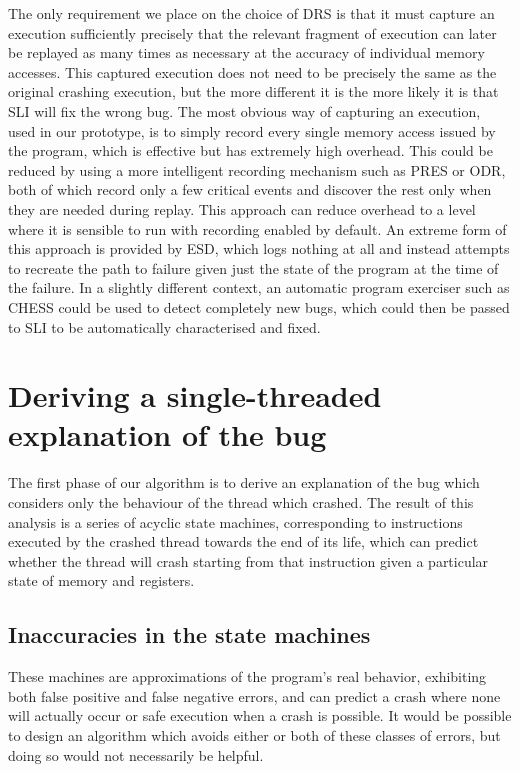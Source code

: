 \documentclass[10pt,twocolumn,preprint,natbib,authoryear]{sigplanconf}
\begin{document}
The only requirement we place on the choice of DRS is that it must
capture an execution sufficiently precisely that the relevant fragment
of execution can later be replayed as many times as necessary at the
accuracy of individual memory accesses.  This captured execution does
not need to be precisely the same as the original crashing execution,
but the more different it is the more likely it is that SLI will fix
the wrong bug.  The most obvious way of capturing an execution, used
in our prototype, is to simply record every single memory access
issued by the program, which is effective but has extremely high
overhead.  This could be reduced by using a more intelligent recording
mechanism such as PRES\cite{Park2009} or ODR\cite{Altekar2009}, both
of which record only a few critical events and discover the rest only
when they are needed during replay.  This approach can reduce overhead
to a level where it is sensible to run with recording enabled by
default.  An extreme form of this approach is provided by
ESD\cite{Zamfir2010}, which logs nothing at all and instead attempts
to recreate the path to failure given just the state of the program at
the time of the failure.  In a slightly different context, an
automatic program exerciser such as CHESS\cite{Musuvathi2008} could be
used to detect completely new bugs, which could then be passed to SLI
to be automatically characterised and fixed.

\section{Deriving a single-threaded explanation of the bug}
\label{sect:build_state_machines}

The first phase of our algorithm is to derive an explanation of the
bug which considers only the behaviour of the thread which crashed.
The result of this analysis is a series of acyclic state machines,
corresponding to instructions executed by the crashed thread towards
the end of its life, which can predict whether the thread will crash
starting from that instruction given a particular state of memory and
registers.

\subsection{Inaccuracies in the state machines}

These machines are approximations of the program's real behavior,
exhibiting both false positive and false negative errors, and can
predict a crash where none will actually occur or safe execution when
a crash is possible.  It would be possible to design an algorithm
which avoids either or both of these classes of errors, but doing so
would not necessarily be helpful.
\end{document}
